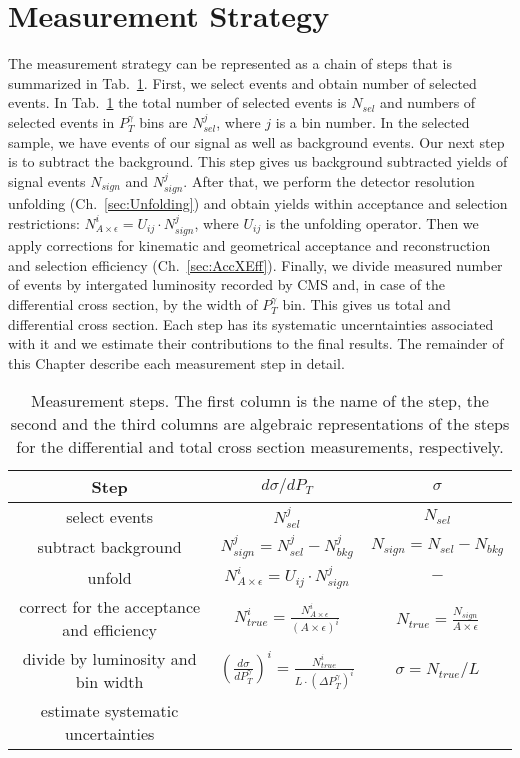 \section{Measurement Strategy}
\label{sec:AN_WgMeasStrategy}

The measurement strategy can be represented as a chain of steps that is summarized in Tab.~\ref{tab:analysisOutline}. First, we select events and obtain number of selected events. In Tab.~\ref{tab:analysisOutline} the total number of selected events is $N_{sel}$ and numbers of selected events in $P_T^{\gamma}$ bins are $N_{sel}^j$, where $j$ is a bin number. In the selected sample, we have events of our signal as well as background events. Our next step is to subtract the background. This step gives us background subtracted yields of signal events $N_{sign}$ and $N_{sign}^j$. After that, we perform the detector resolution unfolding (Ch.~\ref{sec:Unfolding}) and obtain yields within acceptance and selection restrictions: $N_{A\times\epsilon}^i = U_{ij} \cdot N_{sign}^j$, where $U_{ij}$ is the unfolding operator. Then we apply corrections for kinematic and geometrical acceptance and reconstruction and selection efficiency (Ch.~\ref{sec:AccXEff}). Finally, we divide measured number of events by intergated luminosity recorded by CMS and, in case of the differential cross section, by the width of $P_T^{\gamma}$ bin. This gives us total and differential cross section. Each step has its systematic uncerntainties associated with it and we estimate their contributions to the final results. The remainder of this Chapter describe each measurement step in detail.

\begin{table}[h]
  \small
  \begin{center}
  \caption{Measurement steps. The first column is the name of the step, the second and the third columns are algebraic representations of the steps for the differential and total cross section measurements, respectively. }
  \begin{tabular}{|c|c|c|}
    \hline
    Step & $d\sigma/dP_{T}$ & $\sigma$ \\ \hline
    select events & $N_{sel}^j$ &    $N_{sel}$       \\ \hline
    subtract background & $N_{sign}^j = N_{sel}^j - N_{bkg}^j$ &    $N_{sign}=N_{sel}-N_{bkg}$       \\ \hline
    unfold   & $N_{A\times\epsilon}^i = U_{ij} \cdot N_{sign}^j$ &    $-$       \\ \hline
    correct for the acceptance and efficiency & $N_{true}^i = \frac{N_{A\times\epsilon}^i}{(A \times\epsilon)^i}$ &  $N_{true}=\frac{N_{sign}}{A\times\epsilon}$       \\ \hline
    divide by luminosity and bin width & $ \left( \frac{d\sigma}{dP_{T}^\gamma} \right) ^i = \frac{N_{true}^i}{L \cdot (\Delta P_T^\gamma)^i}$  &  $\sigma = N_{true}/L$       \\ \hline
    estimate systematic uncertainties &  &         \\ \hline
  \end{tabular}
  \label{tab:analysisOutline}
  \end{center}
\end{table}

